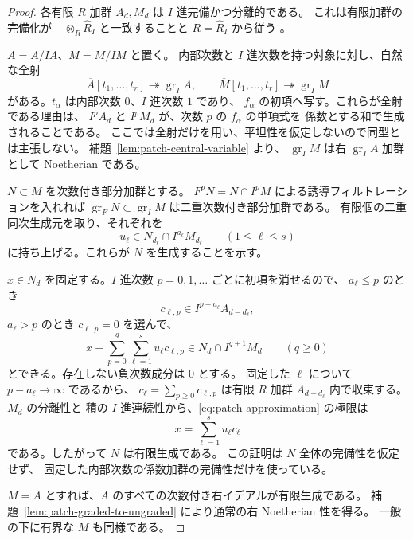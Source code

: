 \begin{proof}
各有限 $R$ 加群 $A_d,M_d$ は $I$ 進完備かつ分離的である。
これは有限加群の完備化が $-\otimes_R\widehat R_I$ と一致することと
$R=\widehat R_I$ から従う
\cite[Tag 00MA]{StacksCompletionPatching}。

$\overline A=A/IA$、$\overline M=M/IM$ と置く。
内部次数と $I$ 進次数を持つ対象に対し、自然な全射
\begin{equation}\label{eq:patch-gr-surjections}
 \overline A[t_1,\ldots,t_r]\twoheadrightarrow\operatorname{gr}_I A,
 \qquad
 \overline M[t_1,\ldots,t_r]\twoheadrightarrow\operatorname{gr}_I M
\end{equation}
がある。$t_\alpha$ は内部次数 $0$、$I$ 進次数 $1$ であり、
$f_\alpha$ の初項へ写す。これらが全射である理由は、
$I^p A_d$ と $I^p M_d$ が、次数 $p$ の $f_\alpha$ の単項式を
係数とする和で生成されることである。
ここでは全射だけを用い、平坦性を仮定しないので同型とは主張しない。
補題~\ref{lem:patch-central-variable} より、
$\operatorname{gr}_I M$ は右 $\operatorname{gr}_I A$ 加群として Noetherian である。

$N\subset M$ を次数付き部分加群とする。
$F^pN=N\cap I^pM$ による誘導フィルトレーションを入れれば
$\operatorname{gr}_F N\subset\operatorname{gr}_I M$ は二重次数付き部分加群である。
有限個の二重同次生成元を取り、それぞれを
\[
 u_\ell\in N_{d_\ell}\cap I^{a_\ell}M_{d_\ell}
 \qquad (1\leq\ell\leq s)
\]
に持ち上げる。これらが $N$ を生成することを示す。

$x\in N_d$ を固定する。$I$ 進次数 $p=0,1,\ldots$ ごとに初項を消せるので、
$a_\ell\leq p$ のとき
\[
 c_{\ell,p}\in I^{p-a_\ell}A_{d-d_\ell},
\]
$a_\ell>p$ のとき $c_{\ell,p}=0$ を選んで、
\begin{equation}\label{eq:patch-approximation}
 x-\sum_{p=0}^{q}\sum_{\ell=1}^s u_\ell c_{\ell,p}
 \in N_d\cap I^{q+1}M_d
 \qquad(q\geq0)
\end{equation}
とできる。存在しない負次数成分は $0$ とする。
固定した $\ell$ について $p-a_\ell\to\infty$ であるから、
$c_\ell=\sum_{p\geq0}c_{\ell,p}$ は有限 $R$ 加群
$A_{d-d_\ell}$ 内で収束する。$M_d$ の分離性と
積の $I$ 進連続性から、\eqref{eq:patch-approximation} の極限は
\[
 x=\sum_{\ell=1}^s u_\ell c_\ell
\]
である。したがって $N$ は有限生成である。
この証明は $N$ 全体の完備性を仮定せず、
固定した内部次数の係数加群の完備性だけを使っている。

$M=A$ とすれば、$A$ のすべての次数付き右イデアルが有限生成である。
補題~\ref{lem:patch-graded-to-ungraded} により通常の右 Noetherian 性を得る。
一般の下に有界な $M$ も同様である。
\end{proof}

